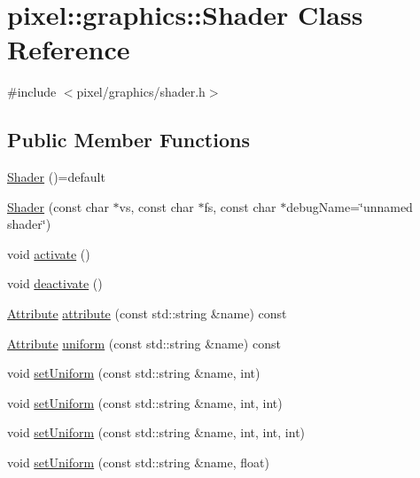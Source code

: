 \hypertarget{classpixel_1_1graphics_1_1_shader}{}\section{pixel\+:\+:graphics\+:\+:Shader Class Reference}
\label{classpixel_1_1graphics_1_1_shader}


{\ttfamily \#include $<$pixel/graphics/shader.\+h$>$}

\subsection*{Public Member Functions}
\begin{DoxyCompactItemize}
\item 
\hyperlink{classpixel_1_1graphics_1_1_shader_ae278868b21e8a3c4a790501bbb3ea247}{Shader} ()=default
\item 
\hyperlink{classpixel_1_1graphics_1_1_shader_a24d7d729d986f748733ad2f9fc66a7e5}{Shader} (const char $\ast$vs, const char $\ast$fs, const char $\ast$debug\+Name=\char`\"{}unnamed shader\char`\"{})
\item 
void \hyperlink{classpixel_1_1graphics_1_1_shader_a27aec380b1a925e6a5b792fd65dbec81}{activate} ()
\item 
void \hyperlink{classpixel_1_1graphics_1_1_shader_aad387a892fb3fea54dfab9ba697f8fb3}{deactivate} ()
\item 
\hyperlink{structpixel_1_1graphics_1_1_attribute}{Attribute} \hyperlink{classpixel_1_1graphics_1_1_shader_afd60c95f6c8b001d83a47480820f682a}{attribute} (const std\+::string \&name) const
\item 
\hyperlink{structpixel_1_1graphics_1_1_attribute}{Attribute} \hyperlink{classpixel_1_1graphics_1_1_shader_ac68243a09958e82a5b0c99b5c8f47ae3}{uniform} (const std\+::string \&name) const
\item 
void \hyperlink{classpixel_1_1graphics_1_1_shader_ac726cfd2ab810f5cc48beea19aeebc7d}{set\+Uniform} (const std\+::string \&name, int)
\item 
void \hyperlink{classpixel_1_1graphics_1_1_shader_afc43e97a317a27f640bb338ae7ca19f3}{set\+Uniform} (const std\+::string \&name, int, int)
\item 
void \hyperlink{classpixel_1_1graphics_1_1_shader_a1dd0b9a6a5b486b64543de588c1b53c0}{set\+Uniform} (const std\+::string \&name, int, int, int)
\item 
void \hyperlink{classpixel_1_1graphics_1_1_shader_a6f940237f8d31ba26833be63a2c9e163}{set\+Uniform} (const std\+::string \&name, float)

\end{DoxyCompactItemize}
